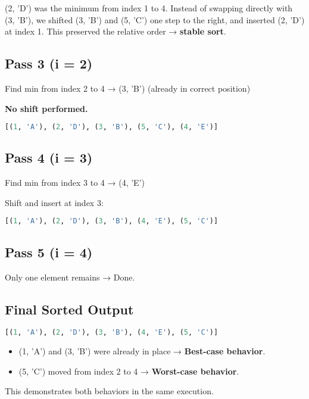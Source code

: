 \documentclass[14pt]{extarticle}
\begin{document}
\begin{tcolorbox}[colback=white, colframe=black, title=What Happened]
(2, 'D') was the minimum from index 1 to 4.  
Instead of swapping directly with (3, 'B'), we shifted (3, 'B') and (5, 'C') one step to the right, and inserted (2, 'D') at index 1.  
This preserved the relative order → \textbf{stable sort}.
\end{tcolorbox}


\subsection*{Pass 3 (i = 2)}
Find min from index 2 to 4 → (3, 'B') (already in correct position)

\textbf{No shift performed.}

\begin{lstlisting}[language=Python]
[(1, 'A'), (2, 'D'), (3, 'B'), (5, 'C'), (4, 'E')]
\end{lstlisting}

\subsection*{Pass 4 (i = 3)}
Find min from index 3 to 4 → (4, 'E')

Shift and insert at index 3:

\begin{lstlisting}[language=Python]
[(1, 'A'), (2, 'D'), (3, 'B'), (4, 'E'), (5, 'C')]
\end{lstlisting}

\subsection*{Pass 5 (i = 4)}
Only one element remains → Done.

\subsection*{Final Sorted Output}

\begin{lstlisting}[language=Python]
[(1, 'A'), (2, 'D'), (3, 'B'), (4, 'E'), (5, 'C')]
\end{lstlisting}

\begin{tcolorbox}[colback=white, colframe=black, title=Summary of Mixed Behavior]
\begin{itemize}
    \item (1, 'A') and (3, 'B') were already in place → \textbf{Best-case behavior}.
    \item (5, 'C') moved from index 2 to 4 → \textbf{Worst-case behavior}.
\end{itemize}
This demonstrates both behaviors in the same execution.
\end{tcolorbox}
\end{document}
